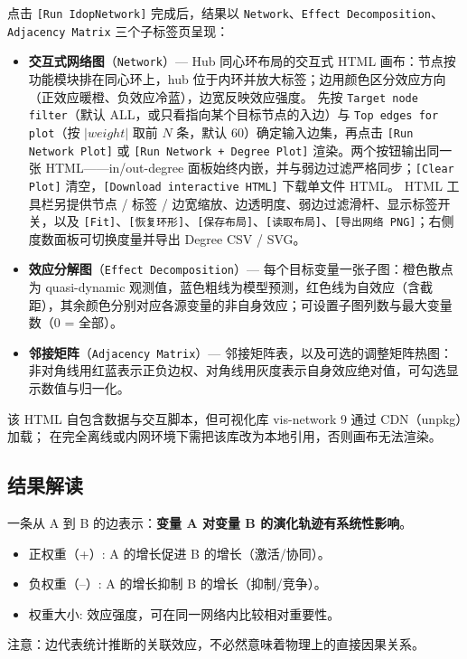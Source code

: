 \documentclass[12pt,a4paper]{ctexart}
\newcommand{\btn}[1]{\texttt{[#1]}}
\newcommand{\tab}[1]{\texttt{#1}}
\newcommand{\param}[1]{\texttt{#1}}
\begin{document}
点击 \btn{Run IdopNetwork} 完成后，结果以 \tab{Network}、\tab{Effect Decomposition}、\tab{Adjacency Matrix} 三个子标签页呈现：

\begin{itemize}[leftmargin=*]
    \item \textbf{交互式网络图}（\tab{Network}）---
    Hub 同心环布局的交互式 HTML 画布：节点按功能模块排在同心环上，hub 位于内环并放大标签；边用颜色区分效应方向（正效应暖橙、负效应冷蓝），边宽反映效应强度。
    先按 \param{Target node filter}（默认 ALL，或只看指向某个目标节点的入边）与 \param{Top edges for plot}（按 $|weight|$ 取前 $N$ 条，默认 60）确定输入边集，再点击 \btn{Run Network Plot} 或 \btn{Run Network + Degree Plot} 渲染。两个按钮输出同一张 HTML——in/out-degree 面板始终内嵌，并与弱边过滤严格同步；\btn{Clear Plot} 清空，\btn{Download interactive HTML} 下载单文件 HTML。
    HTML 工具栏另提供节点 / 标签 / 边宽缩放、边透明度、弱边过滤滑杆、显示标签开关，以及 \btn{Fit}、\btn{恢复环形}、\btn{保存布局}、\btn{读取布局}、\btn{导出网络 PNG}；右侧度数面板可切换度量并导出 Degree CSV / SVG。
    \item \textbf{效应分解图}（\tab{Effect Decomposition}）---
    每个目标变量一张子图：橙色散点为 quasi-dynamic 观测值，蓝色粗线为模型预测，红色线为自效应（含截距），其余颜色分别对应各源变量的非自身效应；可设置子图列数与最大变量数（0 = 全部）。
    \item \textbf{邻接矩阵}（\tab{Adjacency Matrix}）---
    邻接矩阵表，以及可选的调整矩阵热图：非对角线用红蓝表示正负边权、对角线用灰度表示自身效应绝对值，可勾选显示数值与归一化。
\end{itemize}

\begin{infobox}
    该 HTML 自包含数据与交互脚本，但可视化库 vis-network 9 通过 CDN（unpkg）加载；
    在完全离线或内网环境下需把该库改为本地引用，否则画布无法渲染。
\end{infobox}

\subsection{结果解读}

\begin{infobox}[如何理解边]
    一条从 A 到 B 的边表示：\textbf{变量 A 对变量 B 的演化轨迹有系统性影响}。
    \begin{itemize}[leftmargin=*]
        \item 正权重（+）: A 的增长促进 B 的增长（激活/协同）。
        \item 负权重（--）: A 的增长抑制 B 的增长（抑制/竞争）。
        \item 权重大小: 效应强度，可在同一网络内比较相对重要性。
    \end{itemize}
    注意：边代表统计推断的关联效应，不必然意味着物理上的直接因果关系。
\end{infobox}
\end{document}
